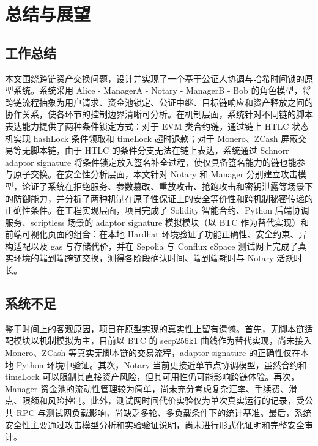 
\chapter{总结与展望}


\section{工作总结}


本文围绕跨链资产交换问题，设计并实现了一个基于公证人协调与哈希时间锁的原型系统。系统采用 Alice - ManagerA - Notary - ManagerB - Bob 的角色模型，将跨链流程抽象为用户请求、资金池锁定、公证中继、目标链响应和资产释放之间的协作关系，使各环节的控制边界清晰可分析。在机制层面，系统针对不同链的脚本表达能力提供了两种条件锁定方式：对于 EVM 类合约链，通过链上 HTLC 状态机实现 hashLock 条件领取和 timeLock 超时退款；对于 Monero、ZCash 屏蔽交易等无脚本链，由于 HTLC 的条件分支无法在链上表达，系统通过 Schnorr adaptor signature 将条件锁定放入签名补全过程，使仅具备签名能力的链也能参与原子交换。在安全性分析层面，本文针对 Notary 和 Manager 分别建立攻击模型，论证了系统在拒绝服务、参数篡改、重放攻击、抢跑攻击和密钥泄露等场景下的防御能力，并分析了两种机制在原子性保证上的安全等价性和跨机制秘密传递的正确性条件。在工程实现层面，项目完成了 Solidity 智能合约、Python 后端协调服务、scriptless 场景的 adaptor signature 模拟模块（以 BTC 作为替代实现）和前端可视化页面的组合：在本地 Hardhat 环境验证了功能正确性、安全约束、异构适配以及 gas 与存储代价，并在 Sepolia 与 Conflux eSpace 测试网上完成了真实环境的端到端跨链交换，测得各阶段确认时间、端到端耗时与 Notary 活跃时长。


\section{系统不足}


鉴于时间上的客观原因，项目在原型实现的真实性上留有遗憾。首先，无脚本链适配模块以机制模拟为主，目前以 BTC 的 secp256k1 曲线作为替代实现，尚未接入 Monero、ZCash 等真实无脚本链的交易流程，adaptor signature 的正确性仅在本地 Python 环境中验证。其次，Notary 当前更接近单节点协调模型，虽然合约和 timeLock 可以限制其直接资产风险，但其可用性仍可能影响跨链体验。再次，Manager 资金池的流动性管理较为简单，尚未充分考虑复杂汇率、手续费、滑点、限额和风险控制。此外，测试网时间代价实验仅为单次真实运行的记录，受公共 RPC 与测试网负载影响，尚缺乏多轮、多负载条件下的统计基准。最后，系统安全性主要通过攻击模型分析和实验验证说明，尚未进行形式化证明和完整安全审计。


